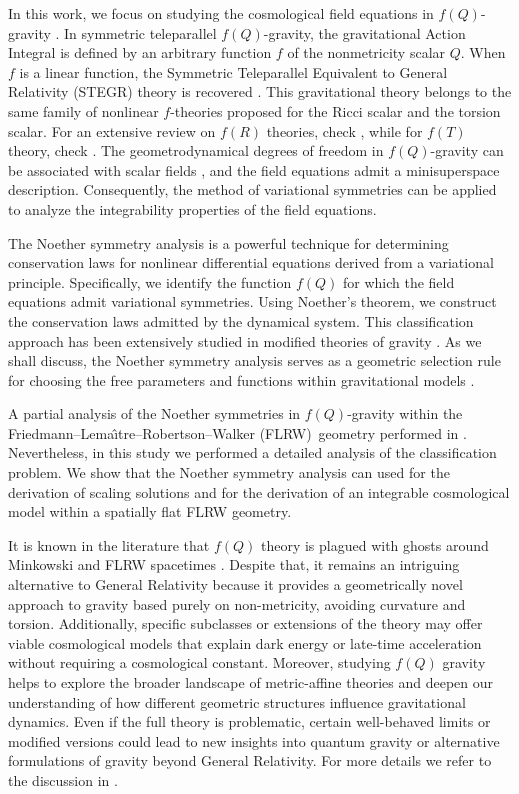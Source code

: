\documentclass[onecolumn,superscriptaddress,secnumarabic,nobibnotes,aps,prd,nofootinbib,altaffilletter,11pt]{revtex4}
\begin{document}
In this work, we focus on studying the cosmological field equations in $%
f\left( Q\right)$-gravity \cite{fq1,fq2}. In symmetric teleparallel $f\left(
Q\right)$-gravity, the gravitational Action Integral is defined by an
arbitrary function $f$ of the nonmetricity scalar $Q$. When $f$ is a linear
function, the Symmetric Teleparallel Equivalent to General Relativity
(STEGR) theory is recovered \cite{Nester:1998mp}. This gravitational theory
belongs to the same family of nonlinear $f$-theories \cite%
{fr1,fr2,fr3,ft1,ft2} proposed for the Ricci scalar and the torsion scalar. For an extensive review on $f(R)$ theories, check \cite{sot1,sot2}, while for $f(T)$ theory, check \cite{Bahamonde:2021gfp}.
The geometrodynamical degrees of freedom in $f\left(Q\right)$-gravity can be
associated with scalar fields \cite{mini}, and the field equations admit a
minisuperspace description. Consequently, the method of variational
symmetries can be applied to analyze the integrability properties of the
field equations.

The Noether symmetry analysis is a powerful technique for determining
conservation laws for nonlinear differential equations derived from a
variational principle. Specifically, we identify the function $%
f\left(Q\right)$ for which the field equations admit variational symmetries.
Using Noether's theorem, we construct the conservation laws admitted by the
dynamical system. This classification approach has been extensively studied
in modified theories of gravity \cite%
{ns1,ns2,ns3,ns5,ns6,ns7,ns8,ns9,ns10,ns11}. As we shall discuss, the
Noether symmetry analysis serves as a geometric selection rule for choosing the free parameters and functions within gravitational models \cite{anrev1,Dialektopoulos:2018qoe}.

A partial analysis of the Noether symmetries in $f\left( Q\right) $-gravity within the Friedmann--Lema\^{\i}tre--Robertson--Walker (FLRW)\ geometry performed in \cite{fqns}. Nevertheless, in this study we performed a detailed analysis of the classification problem. We show that the Noether symmetry analysis can used for the derivation of scaling solutions and for the derivation of an integrable cosmological model within a spatially flat FLRW geometry. 

It is known in the literature that $f(Q)$ theory is plagued with ghosts around Minkowski and FLRW spacetimes \cite{Gomes:2023tur}. Despite that, it remains an intriguing alternative to General Relativity because it provides a geometrically novel approach to gravity based purely on non-metricity, avoiding curvature and torsion. Additionally, specific subclasses or extensions of the theory may offer viable cosmological models that explain dark energy or late-time acceleration without requiring a cosmological constant. Moreover, studying $f(Q)$ gravity helps to explore the broader landscape of metric-affine theories and deepen our understanding of how different geometric structures influence gravitational dynamics. Even if the full theory is problematic, certain well-behaved limits or modified versions could lead to new insights into quantum gravity or alternative formulations of gravity beyond General Relativity. For more details we refer to the discussion in \cite{guzman}.
\end{document}
